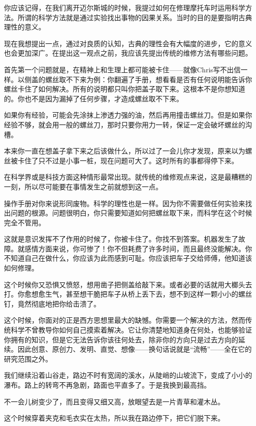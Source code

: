 \documentclass[UTF8]{article}
\begin{document}
\par 你应该记得，在我们离开迈尔斯城的时候，我提过如何在修理摩托车时运用科学方法。所谓的科学方法就是通过实验找出事物的因果关系。当时的目的是要指明古典理性的意义。
\par 现在我想提出一点，通过对良质的认知，古典的理性会有大幅度的进步，它的意义也会更加深广。在提出这一观点之前，我应该先提出传统的维修方法有哪些问题。
\par 首先第一个问题就是，在精神上和生理上都可能被卡住——就像Chris写不出信一样。以侧盖的螺丝取不下来为例：你翻遍了手册，想看看是否有任何说明能告诉你螺丝卡住了如何解决。所有的说明都只叫你把盖子取下来。这根本不是你想知道的。你也不是因为漏掉了任何步骤，才造成螺丝取不下来。
\par 如果你有经验，可能会先涂抹上渗透力强的油，然后再用撞击螺丝刀。但是如果你经验不够，就会用一般的螺丝刀，那时只要你用力一转，保证一定会破坏螺丝的沟槽。
\par 本来你一直在想盖子拿下来之后该做什么，所以过了一会儿你才发现，原来以为螺丝被卡住了只不过是小事一桩，现在问题可大了。这时所有的事都得停下来。
\par 在科学界或是科技方面这种情形最常出现。就传统的维修观点来说，这是最糟糕的一刻，所以尽可能要在事情发生之前就想到这一点。
\par 操作手册对你来说形同废物。科学的理性也是一样。因为你不需要做任何实验来找出问题的根源。问题很明白，你只需要知道如何把螺丝取下来，而科学在这个时候完全不管用。
\par 这就是意识发挥不了作用的时候了，你被卡住了。你找不到答案。机器发生了故障。就感情方面来说，你可惨了！你不但耗费了许多时间，而且最终没能解决。你不知道自己在做什么，你应该为此而感到可耻。你应该把车子交给师傅，他知道该如何修理。
\par 这个时候你又恐惧又愤怒，想用凿子把侧盖给敲下来。或者必要的话就用大榔头去打。你愈想愈生气，甚至想干脆把车子从桥上丢下去，想不到这样一颗小小的螺丝钉，竟然彻底地把你给击溃了。
\par 这个时候，你面对的正是西方思想里最大的缺憾。你需要一个解决的方法，然而传统科学不曾教导你如何自己摸索着解决。它让你清楚地知道身在何处，也能够验证你拥有的知识，但是它无法告诉你该往何处去，除非你的方向只是过去方向的延续。因此创意、原创力、发明、直觉、想像——换句话说就是“流畅”——全在它的研究范围之外。
\par 我们继续沿着山谷走，路边不时有宽阔的溪水，从陡峭的山坡流下，变成了小小的瀑布。路上的转弯不再急剧，路面也平直多了。于是我换到最高挡。
\par 不一会儿树变少了，而且变得又细又高，放眼望去是一片青草和灌木丛。
\par 这个时候穿着夹克和毛衣实在太热，所以我在路边停下，把它们脱下来。
\end{document}
